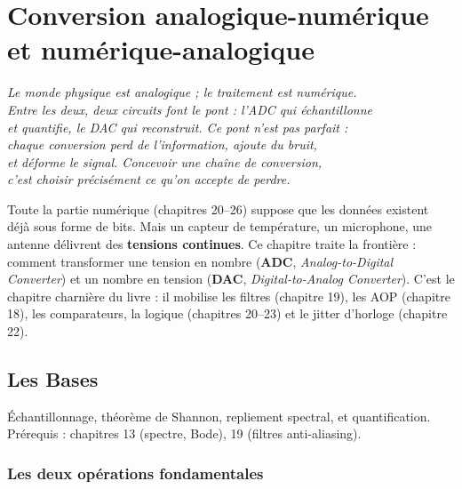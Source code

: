 \documentclass[12pt,a4paper,twoside]{book}
\begin{document}
\chapter{Conversion analogique-numérique et numérique-analogique}

\begin{center}
\textit{Le monde physique est analogique ; le traitement est numérique.\\
Entre les deux, deux circuits font le pont : l'ADC qui échantillonne\\
et quantifie, le DAC qui reconstruit. Ce pont n'est pas parfait :\\
chaque conversion perd de l'information, ajoute du bruit,\\
et déforme le signal. Concevoir une chaîne de conversion,\\
c'est choisir précisément ce qu'on accepte de perdre.}
\end{center}

\vspace{0.5cm}

Toute la partie numérique (chapitres 20--26) suppose que les données existent déjà sous forme de bits. Mais un capteur de température, un microphone, une antenne délivrent des \textbf{tensions continues}. Ce chapitre traite la frontière : comment transformer une tension en nombre (\textbf{ADC}, \textit{Analog-to-Digital Converter}) et un nombre en tension (\textbf{DAC}, \textit{Digital-to-Analog Converter}). C'est le chapitre charnière du livre : il mobilise les filtres (chapitre 19), les AOP (chapitre 18), les comparateurs, la logique (chapitres 20--23) et le jitter d'horloge (chapitre 22).

\section{Les Bases}

\begin{bases}
Échantillonnage, théorème de Shannon, repliement spectral, et quantification. Prérequis : chapitres 13 (spectre, Bode), 19 (filtres anti-aliasing).
\end{bases}

\subsection{Les deux opérations fondamentales}
\end{document}
